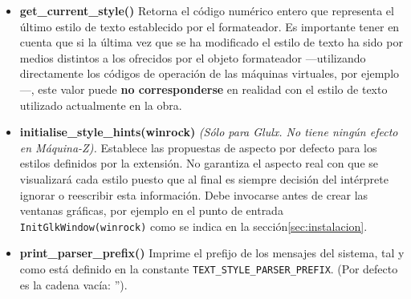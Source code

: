 \documentclass[a4paper,12pt]{article}
\numberwithin{equation}{section}
\begin{document}
\begin{itemize}
    \item \textbf{get\_current\_style()} Retorna el código numérico entero que representa el último estilo de texto establecido por el formateador. Es importante tener en cuenta que si la última vez que se ha modificado el estilo de texto ha sido por medios distintos a los ofrecidos por el objeto formateador ---utilizando directamente los códigos de operación de las máquinas virtuales, por ejemplo---, este valor puede \textbf{no corresponderse} en realidad con el estilo de texto utilizado actualmente en la obra.

	\item \textbf{initialise\_style\_hints(winrock)} \emph{(Sólo para Glulx. No tiene ningún efecto en Máquina-Z).} Establece las propuestas de aspecto por defecto para los estilos definidos por la extensión. No garantiza el aspecto real con que se visualizará cada estilo puesto que al final es siempre decisión del intérprete ignorar o reescribir esta información. Debe invocarse antes de crear las ventanas gráficas, por ejemplo en el punto de entrada \verb|InitGlkWindow(winrock)| como se indica en la sección\ref{sec:instalacion}.

	\item \textbf{print\_parser\_prefix()} Imprime el prefijo de los mensajes del sistema, tal y como está definido en la constante \verb|TEXT_STYLE_PARSER_PREFIX|. (Por defecto es la cadena vacía: '').


\end{itemize}
\end{document}
